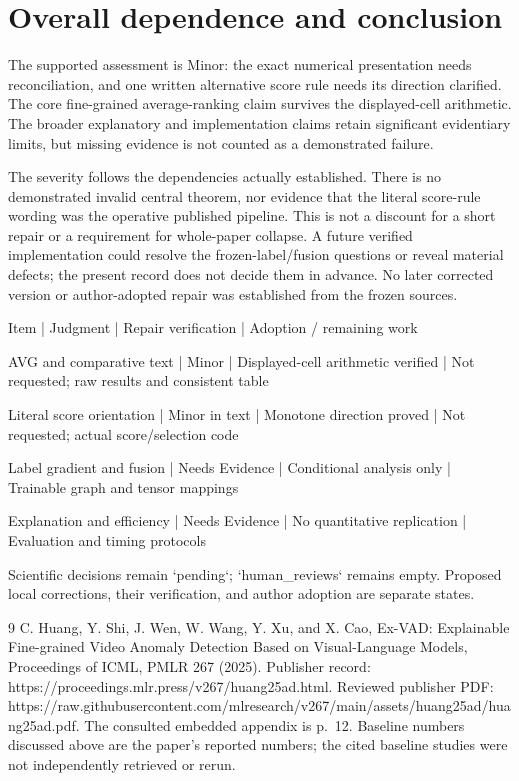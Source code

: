 \documentclass[10pt]{article}
\begin{document}
\section*{Overall dependence and conclusion}
The supported assessment is Minor: the exact numerical presentation needs reconciliation, and one written alternative score rule needs its direction clarified. The core fine-grained average-ranking claim survives the displayed-cell arithmetic. The broader explanatory and implementation claims retain significant evidentiary limits, but missing evidence is not counted as a demonstrated failure.\par
The severity follows the dependencies actually established. There is no demonstrated invalid central theorem, nor evidence that the literal score-rule wording was the operative published pipeline. This is not a discount for a short repair or a requirement for whole-paper collapse. A future verified implementation could resolve the frozen-label/fusion questions or reveal material defects; the present record does not decide them in advance. No later corrected version or author-adopted repair was established from the frozen sources.\par
Item | Judgment | Repair verification | Adoption / remaining work\par
AVG and comparative text | Minor | Displayed-cell arithmetic verified | Not requested; raw results and consistent table\par
Literal score orientation | Minor in text | Monotone direction proved | Not requested; actual score/selection code\par
Label gradient and fusion | Needs Evidence | Conditional analysis only | Trainable graph and tensor mappings\par
Explanation and efficiency | Needs Evidence | No quantitative replication | Evaluation and timing protocols\par
Scientific decisions remain `pending`; `human\_reviews` remains empty. Proposed local corrections, their verification, and author adoption are separate states.\par
9 C. Huang, Y. Shi, J. Wen, W. Wang, Y. Xu, and X. Cao, Ex-VAD: Explainable Fine-grained Video Anomaly Detection Based on Visual-Language Models, Proceedings of ICML, PMLR 267 (2025). Publisher record: https://proceedings.mlr.press/v267/huang25ad.html. Reviewed publisher PDF: https://raw.githubusercontent.com/mlresearch/v267/main/assets/huang25ad/huang25ad.pdf. The consulted embedded appendix is p. 12. Baseline numbers discussed above are the paper’s reported numbers; the cited baseline studies were not independently retrieved or rerun.\par
\end{document}
